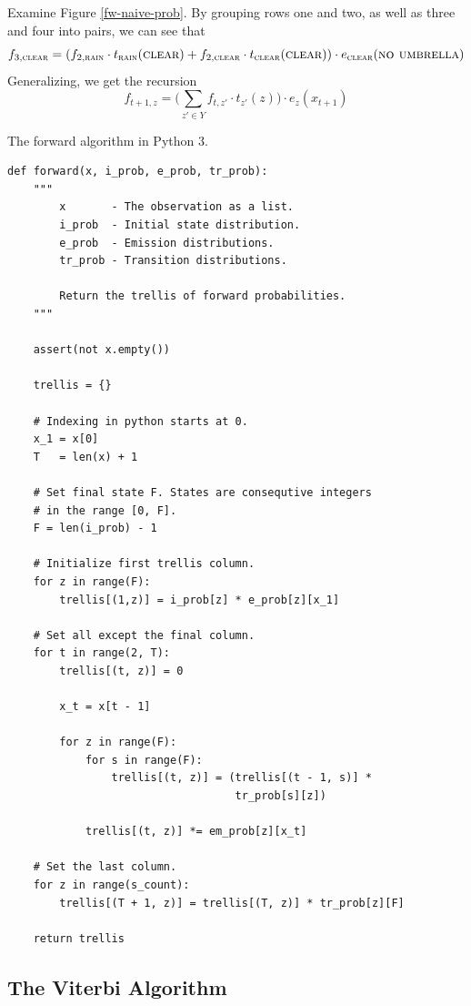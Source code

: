 Examine Figure \ref{fw-naive-prob}. By grouping rows one and two, as
well as three and four into pairs, we can see that
$$f_{3,\textsc{clear}} = (f_{2, \textsc{rain}}\cdot t_{\textsc{rain}}(\textsc{clear}) + f_{2, \textsc{clear}} \cdot t_{\textsc{clear}}(\textsc{clear})) \cdot e_{\textsc{clear}}(\textsc{no\ umbrella})$$
Generalizing, we get the recursion
$$f_{t+1, z} = \Bigg(\sum_{z'\in Y} f_{t, z'}\cdot t_{z'}(z) \Bigg) \cdot e_{z}(x_{t+1})$$
 
\begin{algorithm}[!p]
\caption{The forward algorithm in Python 3.}\label{forward-algorithm}
\begin{lstlisting}
def forward(x, i_prob, e_prob, tr_prob): 
    """
        x       - The observation as a list.
        i_prob  - Initial state distribution.
        e_prob  - Emission distributions.
        tr_prob - Transition distributions.

        Return the trellis of forward probabilities. 
    """

    assert(not x.empty()) 

    trellis = {}

    # Indexing in python starts at 0.
    x_1 = x[0]
    T   = len(x) + 1

    # Set final state F. States are consequtive integers 
    # in the range [0, F]. 
    F = len(i_prob) - 1 

    # Initialize first trellis column.
    for z in range(F):
        trellis[(1,z)] = i_prob[z] * e_prob[z][x_1]

    # Set all except the final column.
    for t in range(2, T):
        trellis[(t, z)] = 0

        x_t = x[t - 1]

        for z in range(F):
            for s in range(F):
                trellis[(t, z)] = (trellis[(t - 1, s)] * 
                                   tr_prob[s][z])

            trellis[(t, z)] *= em_prob[z][x_t]

    # Set the last column.
    for z in range(s_count):
        trellis[(T + 1, z)] = trellis[(T, z)] * tr_prob[z][F]

    return trellis
\end{lstlisting}
\end{algorithm}


\subsection{The Viterbi Algorithm}
\label{hmm-viterbi}

